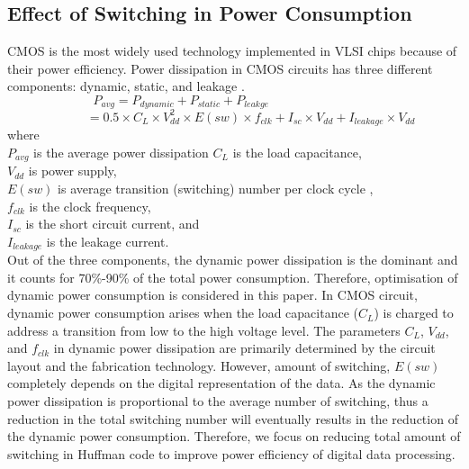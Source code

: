 \documentclass[preprint,12pt]{elsarticle}
\begin{document}
\subsection{Effect of Switching in Power Consumption}
CMOS is the most widely used technology implemented in VLSI chips because of their power efficiency. Power dissipation in CMOS circuits has three different components: dynamic, static, and leakage \cite{Weste88}.
\begin{equation*}
P_{avg} = P_{dynamic}+P_{static}+P_{leakge} ~~~~~~~~~~~~~~~~~~~~~~~~~~~~~~~~~~~~~~
\end{equation*}
\begin{equation}
~~~~~~~~~~~~= 0.5 \times C_{L} \times V_{dd}^{2}\times E(sw)\times f_{clk} + I_{sc} \times V_{dd}+I_{leakage} \times V_{dd}
 \end{equation}
 where\\
  $P_{avg}$ is the average power dissipation
  $C_{L}$ is the load capacitance, \\
  $V_{dd}$ is power supply,\\
  $E(sw)$ is average transition (switching) number per clock cycle ,\\
  $f_{clk}$ is the clock frequency,\\
  $ I_{sc}$ is the short circuit current, and\\
  $ I_{leakage}$ is the leakage current.\\
Out of the three components, the dynamic power dissipation is the dominant and it counts for 70\%-90\% of the total power consumption\cite{pedram1996}. Therefore, optimisation of dynamic power consumption is considered in this paper. In CMOS circuit, dynamic power consumption arises when the load capacitance ($C_{L}$) is charged to address a transition from low to the high voltage level.  The parameters $C_{L}$, $V_{dd}$, and $f_{clk}$ in dynamic power dissipation are primarily determined by the circuit layout and the fabrication technology. However, amount of switching, $E(sw)$ completely depends on the digital representation of the data. As the dynamic power dissipation is proportional  to the average number of switching, thus a reduction in the total switching number will eventually results in the reduction of the dynamic power consumption. Therefore, we focus on reducing total amount of switching in Huffman code to improve power efficiency of digital data processing.
\end{document}

